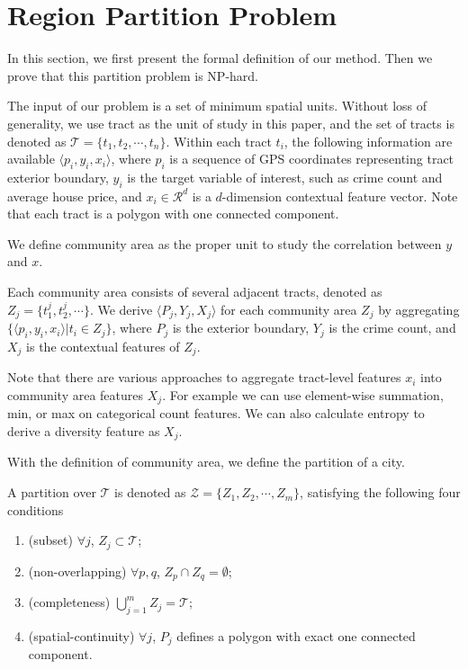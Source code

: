 \section{Region Partition Problem}
\label{ch4-sec:problem}

In this section, we first present the formal definition of our method. Then we prove that this partition problem is NP-hard.


The input of our problem is a set of minimum spatial units. Without loss of generality, we use tract as the unit of study in this paper, and the set of tracts is denoted as $\mathcal{T} = \{ t_1, t_2, \cdots, t_n \}$. Within each tract $t_i$, the following information are available $\langle p_i, y_i, x_i \rangle$, where $p_i$ is a sequence of GPS coordinates representing tract exterior boundary, $y_i$ is the target variable of interest, such as crime count and average house price, and $x_i \in \mathcal{R}^d$ is a $d$-dimension contextual feature vector. Note that each tract is a polygon with one connected component.

We define community area as the proper unit to study the correlation between $y$ and $x$.
\begin{definition}
 Each community area consists of several adjacent tracts, denoted as $Z_j = \{t_1^j, t_2^j, \cdots \}$. We derive $\langle P_j, Y_j, X_j \rangle$ for each community area $Z_j$ by aggregating $\{ \langle p_i, y_i, x_i \rangle | t_i \in Z_j \}$, where $P_j$ is the exterior boundary, $Y_j$ is the crime count, and $X_j$ is the contextual features of $Z_j$.
\end{definition}
Note that there are various approaches to aggregate tract-level features $x_i$ into community area features $X_j$. For example we can use element-wise summation, min, or max on categorical count features. We can also calculate entropy to derive a diversity feature as $X_j$.

With the definition of community area, we define the partition of a city.
\begin{definition}[Partition]
\label{def:partition}
A partition over $\mathcal{T}$ is denoted as $\mathcal{Z} = \{ Z_1, Z_2, \cdots, Z_m\}$, satisfying the following four conditions
\begin{enumerate}
\item (subset) $\forall j$, $Z_j \subset \mathcal{T}$;
\item (non-overlapping) $\forall p, q$, $Z_p \cap Z_q = \emptyset$;
\item (completeness) $\bigcup_{j=1}^m Z_j = \mathcal{T}$;
\item (spatial-continuity) $\forall j$, $P_j$ defines a polygon with exact one connected component.
\end{enumerate}
\end{definition}

